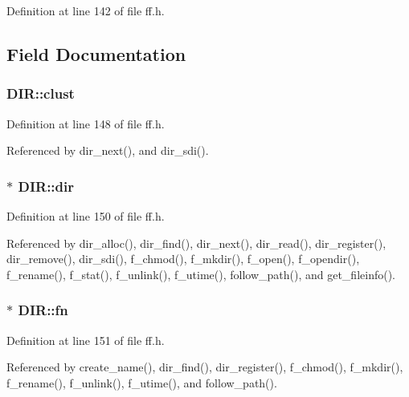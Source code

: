 Definition at line 142 of file ff.\-h.



\subsection{Field Documentation}
\hypertarget{structDIR_acfbb8ba2d6e73b6f999ceffd1857c190}{
\subsubsection[{clust}]{ D\-I\-R\-::clust}}\label{structDIR_acfbb8ba2d6e73b6f999ceffd1857c190}


Definition at line 148 of file ff.\-h.



Referenced by dir\-\_\-next(), and dir\-\_\-sdi().

\hypertarget{structDIR_a6c2a8c0cf2d55ae99775e93a16593449}{
\subsubsection[{dir}]{$\ast$ D\-I\-R\-::dir}}\label{structDIR_a6c2a8c0cf2d55ae99775e93a16593449}


Definition at line 150 of file ff.\-h.



Referenced by dir\-\_\-alloc(), dir\-\_\-find(), dir\-\_\-next(), dir\-\_\-read(), dir\-\_\-register(), dir\-\_\-remove(), dir\-\_\-sdi(), f\-\_\-chmod(), f\-\_\-mkdir(), f\-\_\-open(), f\-\_\-opendir(), f\-\_\-rename(), f\-\_\-stat(), f\-\_\-unlink(), f\-\_\-utime(), follow\-\_\-path(), and get\-\_\-fileinfo().

\hypertarget{structDIR_a32da2f31d6c3b6c42eef981cb0cfd2ee}{
\subsubsection[{fn}]{$\ast$ D\-I\-R\-::fn}}\label{structDIR_a32da2f31d6c3b6c42eef981cb0cfd2ee}


Definition at line 151 of file ff.\-h.



Referenced by create\-\_\-name(), dir\-\_\-find(), dir\-\_\-register(), f\-\_\-chmod(), f\-\_\-mkdir(), f\-\_\-rename(), f\-\_\-unlink(), f\-\_\-utime(), and follow\-\_\-path().


